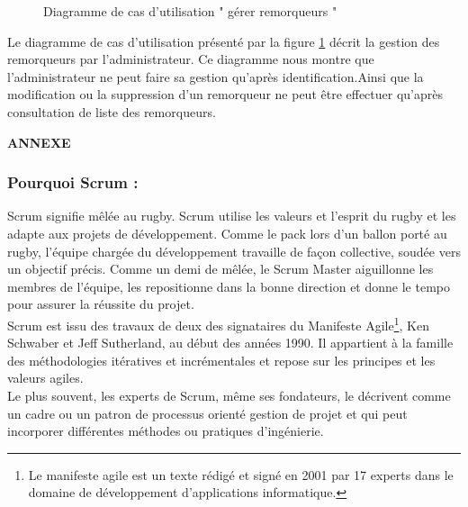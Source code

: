 \documentclass{article}
\begin{document}
\begin{enumerate}
\begin{figure}[H]
\caption[Figure14 : Diagramme de cas d'utilisation " gérer remorqueurs "]{Diagramme de cas d'utilisation " gérer remorqueurs "}
\label{fig:pic14}
\end{figure}
Le diagramme de cas d'utilisation présenté par la figure \ref{fig:pic14} décrit la gestion des
remorqueurs par l'administrateur. Ce diagramme nous montre que l'administrateur ne peut faire sa gestion qu'après identification.Ainsi que la modification ou la
suppression d'un remorqueur ne peut être effectuer qu'après consultation de liste des remorqueurs.
\end{enumerate}
\begin{titlepage}\centering
\vspace*{\fill}
\textbf{\LARGE ANNEXE }
\vspace*{\fill}
\end{titlepage}
\setcounter{page}{41}
\appendix
\subsubsection*{Pourquoi Scrum :}
\vspace{0.5cm}
\vspace{0.3cm}

\guillemotleft Scrum signifie mêlée au rugby. Scrum utilise les valeurs et l’esprit du rugby et les adapte aux projets de développement. Comme le pack lors d’un ballon porté au rugby, l’équipe chargée du développement travaille de façon collective, soudée vers un objectif précis. Comme un demi de mêlée, le Scrum Master aiguillonne les membres de l’équipe, les repositionne dans la bonne direction et donne le tempo pour assurer la réussite du projet. \guillemotright [1]\\\label{sec:hello}
Scrum est issu des travaux de deux des signataires du Manifeste Agile\footnote{Le manifeste agile est un texte rédigé et signé en 2001 par 17 experts dans le domaine de développement d’applications informatique.}, Ken Schwaber et Jeff Sutherland, au début des années 1990. Il appartient à la famille des méthodologies itératives et incrémentales et repose sur les principes et les valeurs agiles.\\
Le plus souvent, les experts de Scrum, même ses fondateurs, le décrivent comme un cadre ou un patron de processus orienté gestion de projet et qui peut incorporer différentes méthodes ou pratiques d’ingénierie.
\end{document}
